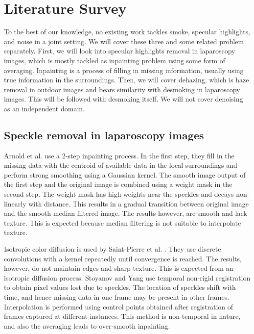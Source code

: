 
\chapter{Literature Survey}

To the best of our knowledge, no existing work tackles smoke, specular highlights, and noise in a joint setting. We will cover these three and some related problem separately. First, we will look into specular highlights removal in laparoscopy images, which is mostly tackled as inpainting problem using some form of averaging. Inpainting is a process of filling in missing information, usually using true information in the surroundings. Then, we will cover dehazing, which is haze removal in outdoor images and bears similarity with desmoking in laparoscopy images. This will be followed with desmoking itself. We will not cover denoising as an independent domain.

\section{Speckle removal in laparoscopy images}
Arnold et al.\cite{arnold2010speckle} use a 2-step inpainting process. In the first step, they fill in the missing data with the centroid of available data in the local surroundings and perform strong smoothing using a Gaussian kernel. The smooth image output of the first step and the original image is combined using a weight mask in the second step. The weight mask has high weights near the speckles and decays non-linearly with distance. This results in a gradual transition between original image and the smooth median filtered image. The results however, are smooth and lack texture. This is expected because median filtering is not suitable to interpolate texture.

Isotropic color diffusion is used by Saint-Pierre et al. \cite{saint2011detection}. They use discrete convolutions with a kernel repeatedly until convergence is reached. The results, however, do not maintain edges and sharp texture. This is expected from an isotropic diffusion process. Stoyanov and Yang \cite{stoyanov2005removing} use temporal non-rigid registration to obtain pixel values lost due to speckles. The location of speckles shift with time, and hence missing data in one frame may be present in other frames. Interpolation is performed using control points obtained after registration of frames captured at different instances. This method is non-temporal in nature, and also the averaging leads to over-smooth inpainting.

